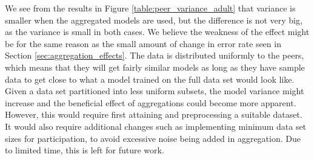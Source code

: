 We see from the results in Figure \ref{table:peer_variance_adult} that variance is smaller when the aggregated models are used, but the difference is not very big, as the variance is small in both cases. We believe the weakness of the effect might be for the same reason as the small amount of change in error rate seen in Section \ref{sec:aggregation_effects}. The data is distributed uniformly to the peers, which means that they will get fairly similar models as long as they have sample data to get close to what a model trained on the full data set would look like. Given a data set partitioned into less uniform subsets, the model variance might increase and the beneficial effect of aggregations could become more apparent. However, this would require first attaining and preprocessing a suitable dataset. It would also require additional changes such as implementing minimum data set sizes for participation, to avoid excessive noise being added in aggregation. Due to limited time, this is left for future work.


